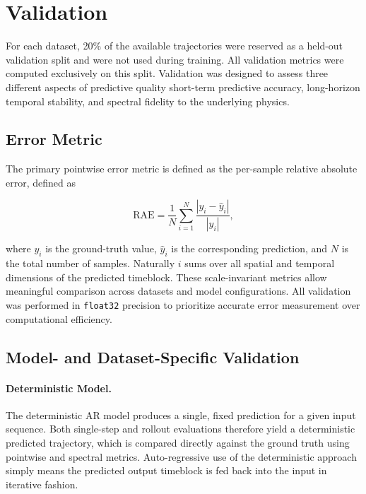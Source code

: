

\section{Validation}

For each dataset, 20\% of the available trajectories were reserved as a held-out validation split and were not used during training. All validation metrics were computed exclusively on this split. Validation was designed to assess three different aspects of predictive quality short-term predictive accuracy, long-horizon temporal stability, and spectral fidelity to the underlying physics.

\subsection{Error Metric}

The primary pointwise error metric is defined as the per-sample relative absolute error, defined as

\begin{equation}
	\text{RAE} = \frac{1}{N}\sum_{i=1}^{N} \frac{ \left| y_i - \hat{y}_i \right|}{\left| y_i \right|},
\end{equation}

where $y_i$ is the ground-truth value, $\hat{y}_i$ is the corresponding prediction, and $N$ is the total number of samples. Naturally $i$ sums over all spatial and temporal dimensions of the predicted timeblock. These scale-invariant metrics allow meaningful comparison across datasets and model configurations. All validation was performed in \texttt{float32} precision to prioritize accurate error measurement over computational efficiency.

\subsection{Model- and Dataset-Specific Validation}

\paragraph{Deterministic Model.}
The deterministic AR model produces a single, fixed prediction for a given input sequence. Both single-step and rollout evaluations therefore yield a deterministic predicted trajectory, which is compared directly against the ground truth using pointwise and spectral metrics. Auto-regressive use of the deterministic approach simply means the predicted output timeblock is fed back into the input in iterative fashion.

